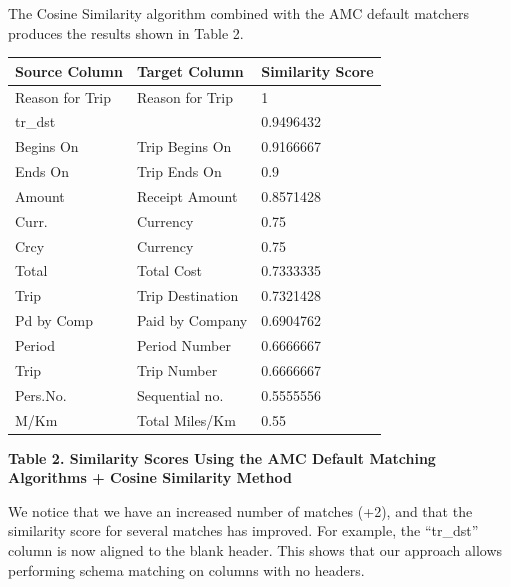 \documentclass{sig-alternate}
\begin{document}
The Cosine Similarity algorithm combined with the AMC default matchers produces the results shown in Table 2.

\begin{tabular}{|p{0.7in}|p{0.8in}|p{0.8in}|} \hline
\textbf{Source Column} & \textbf{Target Column} & \textbf{Similarity Score} \\ \hline
Reason for Trip & Reason for Trip & 1 \\ \hline
tr\_dst &  & 0.9496432 \\ \hline
Begins On & Trip Begins On & 0.9166667 \\ \hline
Ends On & Trip Ends On & 0.9 \\ \hline
Amount & Receipt Amount & 0.8571428 \\ \hline
Curr. & Currency & 0.75 \\ \hline
Crcy & Currency & 0.75 \\ \hline
Total & Total Cost & 0.7333335 \\ \hline
Trip & Trip Destination & 0.7321428 \\ \hline
Pd by Comp & Paid by Company & 0.6904762 \\ \hline
Period & Period Number & 0.6666667 \\ \hline
Trip & Trip Number & 0.6666667 \\ \hline
Pers.No. & Sequential no. & 0.5555556 \\ \hline
M/Km & Total Miles/Km & 0.55 \\ \hline
\end{tabular}



\textbf{Table 2. Similarity Scores Using the AMC Default Matching Algorithms + Cosine Similarity Method}

We notice that we have an increased number of matches (+2), and that the similarity score for several matches has improved. For example, the ``tr\_dst'' column is now aligned to the blank header. This shows that our approach allows performing schema matching on columns with no headers.
\end{document}

